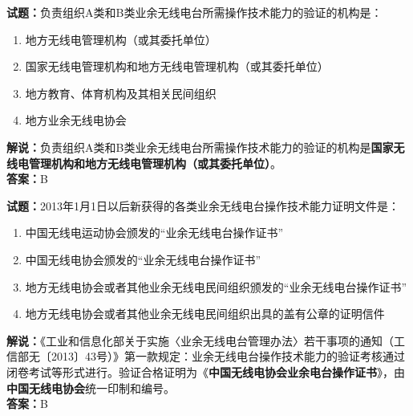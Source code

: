 \documentclass{ctexbook}
\begin{document}
\vspace{\baselineskip}

\noindent\textbf{试题：}负责组织A类和B类业余无线电台所需操作技术能力的验证的机构是：
\begin{enumerate}[leftmargin=3em]
  \item 地方无线电管理机构（或其委托单位）
  \item 国家无线电管理机构和地方无线电管理机构（或其委托单位）
  \item 地方教育、体育机构及其相关民间组织
  \item 地方业余无线电协会
\end{enumerate}
\noindent\textbf{解说：}负责组织A类和B类业余无线电台所需操作技术能力的验证的机构是\textbf{国家无线电管理机构和地方无线电管理机构（或其委托单位）}。\\\noindent\textbf{答案：}B

\vspace{\baselineskip}

\noindent\textbf{试题：}2013年1月1日以后新获得的各类业余无线电台操作技术能力证明文件是：
\begin{enumerate}[leftmargin=3em]
  \item 中国无线电运动协会颁发的“业余无线电台操作证书”
  \item 中国无线电协会颁发的“业余无线电台操作证书”
  \item 地方无线电协会或者其他业余无线电民间组织颁发的“业余无线电台操作证书”
  \item 地方无线电协会或者其他业余无线电民间组织出具的盖有公章的证明信件
\end{enumerate}
\noindent\textbf{解说：}《工业和信息化部关于实施〈业余无线电台管理办法〉若干事项的通知（工信部无〔2013〕43号）》第一款规定：业余无线电台操作技术能力的验证考核通过闭卷考试等形式进行。验证合格证明为《\textbf{中国无线电协会业余电台操作证书}》，由\textbf{中国无线电协会}统一印制和编号。\\\noindent\textbf{答案：}B

\vspace{\baselineskip}
\end{document}
